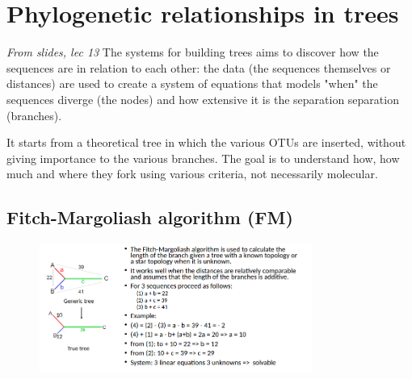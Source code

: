 \section{Phylogenetic relationships in trees}
\emph{From slides, lec 13}
The systems for building trees aims to discover how the sequences are in
relation to each other: the data (the sequences themselves or distances) are used to create a system of equations that models "when" the sequences diverge (the nodes) and how extensive it is the separation separation (branches).

It starts from a theoretical tree in which the various OTUs are inserted, without giving importance to the various branches. The goal is to understand how, how much and where they fork using various criteria, not necessarily molecular.

\subsection{Fitch-Margoliash algorithm (FM)}
\begin{figure}[H]
		\centering
		\includegraphics[width=0.8\textwidth]{ex1.png}
		\caption{}
		\label{fig:ex1}
	\end{figure}
















